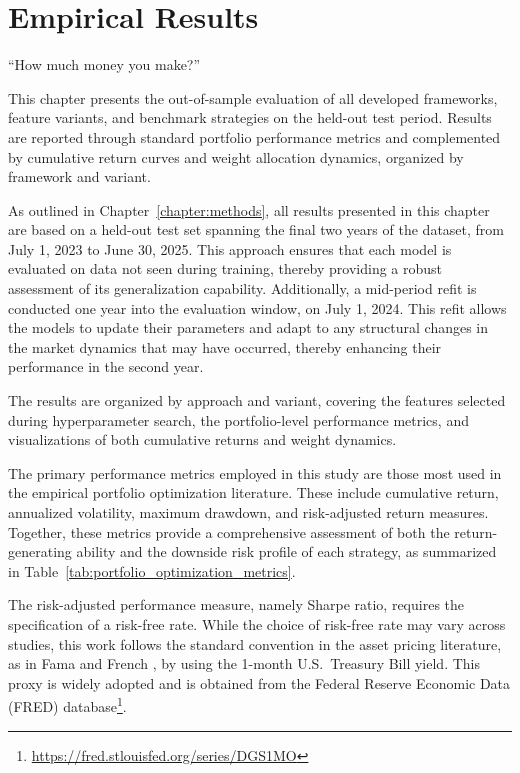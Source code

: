 \chapter{Empirical Results}
\label{chapter:empirical_results}

\begin{introduction}
\begin{flushright}
``How much money you make?''
\end{flushright}

\vspace{0.5em}

This chapter presents the out-of-sample evaluation of all developed frameworks, feature variants, and benchmark strategies on the held-out test period. Results are reported through standard portfolio performance metrics and complemented by cumulative return curves and weight allocation dynamics, organized by framework and variant.
\end{introduction}


As outlined in Chapter~\ref{chapter:methods}, all results presented in this chapter are based on a held-out test set spanning the final two years of the dataset, from July 1, 2023 to June 30, 2025. This approach ensures that each model is evaluated on data not seen during training, thereby providing a robust assessment of its generalization capability. Additionally, a mid-period refit is conducted one year into the evaluation window, on July 1, 2024. This refit allows the models to update their parameters and adapt to any structural changes in the market dynamics that may have occurred, thereby enhancing their performance in the second year.

The results are organized by approach and variant, covering the features selected during hyperparameter search, the portfolio-level performance metrics, and visualizations of both cumulative returns and weight dynamics.

The primary performance metrics employed in this study are those most used in the empirical portfolio optimization literature. These include cumulative return, annualized volatility, maximum drawdown, and risk-adjusted return measures. Together, these metrics provide a comprehensive assessment of both the return-generating ability and the downside risk profile of each strategy, as summarized in Table~\ref{tab:portfolio_optimization_metrics}.

The risk-adjusted performance measure, namely Sharpe ratio, requires the specification of a risk-free rate. While the choice of risk-free rate may vary across studies, this work follows the standard convention in the asset pricing literature, as in Fama and French \cite{e60f7}, by using the 1-month U.S.\ Treasury Bill yield. This proxy is widely adopted and is obtained from the Federal Reserve Economic Data (FRED) database\footnote{\url{https://fred.stlouisfed.org/series/DGS1MO}}.

